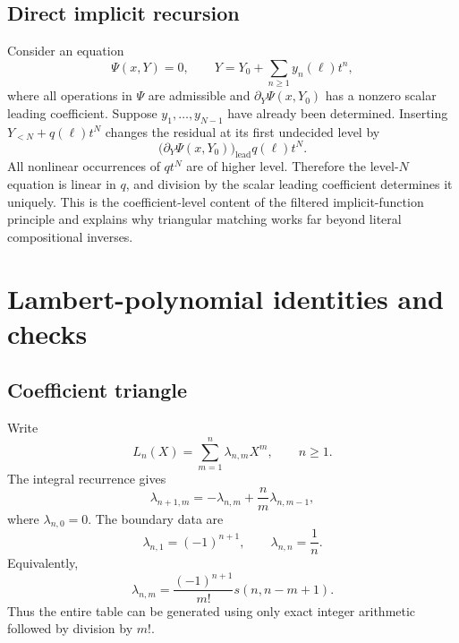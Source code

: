 \documentclass[11pt,oneside]{article}
\numberwithin{equation}{section}
\theoremstyle{definition}
\begin{document}
\subsection{Direct implicit recursion}

Consider an equation
\begin{equation}\label{eq:implicit-Psi-equation}
  \Psi(x,Y)=0,
  \qquad
  Y=Y_0+\sum_{n\ge1}y_n(\ell)t^n,
\end{equation}
where all operations in \(\Psi\) are admissible and
\(\partial_Y\Psi(x,Y_0)\) has a nonzero scalar leading coefficient.  Suppose
\(y_1,\ldots,y_{N-1}\) have already been determined.  Inserting
\(Y_{<N}+q(\ell)t^N\) changes the residual at its first undecided level by
\begin{equation}\label{eq:implicit-linearization-level}
  \bigl(\partial_Y\Psi(x,Y_0)\bigr)_{\mathrm{lead}}
  q(\ell)t^N.
\end{equation}
All nonlinear occurrences of \(q t^N\) are of higher level.  Therefore the
level-\(N\) equation is linear in \(q\), and division by the scalar leading
coefficient determines it uniquely.  This is the coefficient-level content of
the filtered implicit-function principle and explains why triangular matching
works far beyond literal compositional inverses.

\section{Lambert-polynomial identities and checks}\label{app:lambert}

\subsection{Coefficient triangle}

Write
\begin{equation}\label{eq:Lambert-coefficient-triangle}
  L_n(X)=\sum_{m=1}^{n}\lambda_{n,m}X^m,
  \qquad n\ge1.
\end{equation}
The integral recurrence gives
\begin{equation}\label{eq:lambda-triangle-recurrence}
  \lambda_{n+1,m}
   =-\lambda_{n,m}+\frac{n}{m}\lambda_{n,m-1},
\end{equation}
where \(\lambda_{n,0}=0\).  The boundary data are
\begin{equation}\label{eq:lambda-boundary}
  \lambda_{n,1}=(-1)^{n+1},
  \qquad
  \lambda_{n,n}=\frac1n.
\end{equation}
Equivalently,
\begin{equation}\label{eq:lambda-Stirling}
  \lambda_{n,m}
   =\frac{(-1)^{n+1}}{m!}
      s(n,n-m+1).
\end{equation}
Thus the entire table can be generated using only exact integer arithmetic
followed by division by \(m!\).
\end{document}
